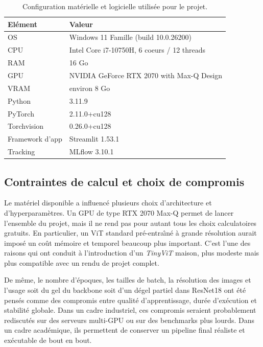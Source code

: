 \documentclass[11pt,a4paper]{article}
\begin{document}
\begin{table}[H]
    \centering
    \caption{Configuration mat\'erielle et logicielle utilis\'ee pour le projet.}
    \begin{tabular}{p{5cm}p{8cm}}
        \toprule
        El\'ement & Valeur \\
        \midrule
        OS & Windows 11 Famille (build 10.0.26200) \\
        CPU & Intel Core i7-10750H, 6 coeurs / 12 threads \\
        RAM & 16 Go \\
        GPU & NVIDIA GeForce RTX 2070 with Max-Q Design \\
        VRAM & environ 8 Go \\
        Python & 3.11.9 \\
        PyTorch & 2.11.0+cu128 \\
        Torchvision & 0.26.0+cu128 \\
        Framework d'app & Streamlit 1.53.1 \\
        Tracking & MLflow 3.10.1 \\
        \bottomrule
    \end{tabular}
\end{table}

\subsection{Contraintes de calcul et choix de compromis}
Le mat\'eriel disponible a influenc\'e plusieurs choix d'architecture et d'hyperparam\`etres. Un GPU de type RTX 2070 Max-Q permet de lancer l'ensemble du projet, mais il ne rend pas pour autant tous les choix calculatoires gratuits. En particulier, un ViT standard pr\'e-entra\^\i n\'e \`a grande r\'esolution aurait impos\'e un co\^ut m\'emoire et temporel beaucoup plus important. C'est l'une des raisons qui ont conduit \`a l'introduction d'un \emph{TinyViT} maison, plus modeste mais plus compatible avec un rendu de projet complet.

De m\^eme, le nombre d'\'epoques, les tailles de batch, la r\'esolution des images et l'usage soit du gel du backbone soit d'un d\'egel partiel dans ResNet18 ont \'et\'e pens\'es comme des compromis entre qualit\'e d'apprentissage, dur\'ee d'ex\'ecution et stabilit\'e globale. Dans un cadre industriel, ces compromis seraient probablement rediscut\'es sur des serveurs multi-GPU ou sur des benchmarks plus lourds. Dans un cadre acad\'emique, ils permettent de conserver un pipeline final r\'ealiste et ex\'ecutable de bout en bout.
\end{document}
